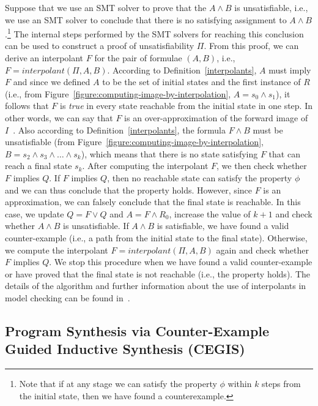 \documentclass[format=acmsmall, review=false, screen=true]{acmart}
\begin{document}
Suppose that we use an SMT solver to prove that the $A \wedge B$ is unsatisfiable, i.e., we use an SMT solver to conclude that there is no satisfying assignment to $A \wedge B$.\footnote{Note that if at any stage we can satisfy the property $\phi$ within $k$ steps from the initial state, then we have found a counterexample.} The internal steps performed by the SMT solvers for reaching this conclusion can be used to construct a proof of unsatisfiability $\Pi$. From this proof, we can derive an interpolant $F$ for the pair of formulae $\left(A,B\right)$, i.e., $F = interpolant\left(\Pi, A, B\right)$. According to Definition~\ref{interpolants}, $A$ must imply $F$ and since we defined $A$ to be the set of initial states and the first instance of $R$ (i.e., from Figure~\ref{figure:computing-image-by-interpolation}, $A=s_{0} \wedge s_{1}$), it follows that $F$ is \textit{true} in every state reachable from the initial state in one step. In other words, we can say that $F$ is an over-approximation of the forward image of $I$~\cite{McMillan03,McMillan05}. Also according to Definition~\ref{interpolants}, the formula $F \wedge B$ must be unsatisfiable (from Figure~\ref{figure:computing-image-by-interpolation}, $B=s_{2} \wedge s_{3} \wedge \ldots \wedge s_{k}$), which means that there is no state satisfying $F$ that can reach a final state $s_k$. After computing the interpolant $F$, we then check whether $F$ implies $Q$. If $F$ implies $Q$, then no reachable state can satisfy the property $\phi$ and we can thus conclude that the property holds. However, since $F$ is an approximation, we can falsely conclude that the final state is reachable. In this case, we update $Q = F \vee Q$ and $A = F \wedge R_{0}$, increase the value of $k+1$ and check whether $A \wedge B$ is unsatisfiable. If $A \wedge B$ is satisfiable, we have found a valid counter-example (i.e., a path from the initial state to the final state). Otherwise, we compute the interpolant $F = interpolant\left(\Pi, A, B\right)$ again and check whether $F$ implies $Q$. We stop this procedure when we have found a valid counter-example or have proved that the final state is not reachable (i.e., the property holds). The details of the algorithm and further information about the use of interpolants in model checking can be found in~\cite{McMillan03,McMillan05,McMillan06,McMillan07}. 


\subsection{Program Synthesis via Counter-Example \\ Guided Inductive Synthesis (CEGIS)}
\end{document}
